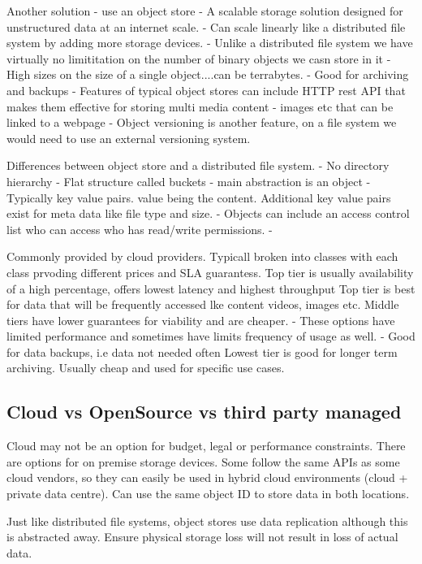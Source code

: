 \documentclass[a4paper, 11pt]{book}
\begin{document}
    Another solution - use an object store
    - A scalable storage solution designed for unstructured data at an internet scale.
    - Can scale linearly like a distributed file system by adding more storage devices.
    - Unlike a distributed file system we have virtually no limititation on the number of binary objects we casn store in it
    - High sizes on the size of a single object....can be terrabytes.
    - Good for archiving and backups
    - Features of typical object stores can include HTTP rest API that makes them effective for storing multi media content - images etc that can be linked to a webpage
    - Object versioning is another feature, on a file system we would need to use an external versioning system.

    Differences between object store and a distributed file system.
    - No directory hierarchy
    - Flat structure called buckets
    - main abstraction is an object
    - Typically key value pairs. value being the content. Additional key value pairs exist for meta data like file type and size.
    - Objects can include an access control list who can access who has read/write permissions.
    -

    Commonly provided by cloud providers.
    Typicall broken into classes with each class prvoding different prices and SLA guarantess.
    Top tier is usually availability of a high percentage, offers lowest latency and highest throughput
    Top tier is best for data that will be frequently accessed lke content videos, images etc.
    Middle tiers have lower guarantees for viability and are cheaper.
    - These options have limited performance and sometimes have limits frequency of usage as well.
    - Good for data backups, i.e data not needed often
    Lowest tier is good for longer term archiving.
    Usually cheap and used for specific use cases.

    \subsection{Cloud vs OpenSource vs third party managed}
    Cloud may not be an option for budget, legal or performance constraints.
    There are options for on premise storage devices.
    Some follow the same APIs as some cloud vendors, so they can easily be used in hybrid cloud environments (cloud + private data centre).
    Can use the same object ID to store data in both locations.


    Just like distributed file systems, object stores use data replication although this is abstracted away.
    Ensure physical storage loss will not result in loss of actual data.
\end{document}
